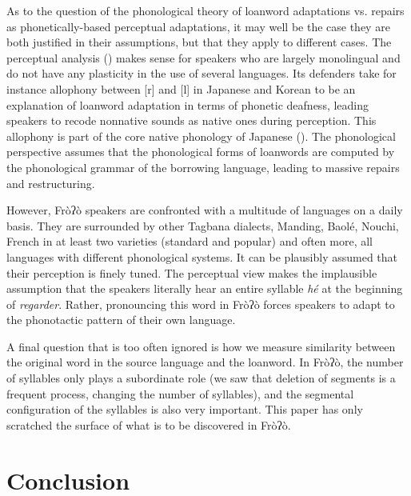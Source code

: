 \documentclass[output=paper]{langscibook}
\begin{document}
As to the question of the phonological theory of loanword adaptations vs. repairs as phonetically{}-based perceptual adaptations, it may well be the case they are both justified in their assumptions, but that they apply to different cases. The perceptual analysis (\citealt{Peperkamp2003}) makes sense for speakers who are largely monolingual and do not have any plasticity in the use of several languages. Its defenders take for instance allophony between [r] and [l] in Japanese and Korean to be an explanation of loanword adaptation in terms of phonetic deafness, leading speakers to recode nonnative sounds as native ones during perception. This allophony is part of the core native phonology of Japanese (\citealt{Ito1995}). The phonological perspective assumes that the phonological forms of loanwords are computed by the phonological grammar of the borrowing language, leading to massive repairs and restructuring. 

However, Fròʔò speakers are confronted with a multitude of languages on a daily basis. They are surrounded by other Tagbana dialects, Manding, Baolé, Nouchi, French in at least two varieties (standard and popular) and often more, all languages with different phonological systems. It can be plausibly assumed that their perception is finely tuned. The perceptual view makes the implausible assumption that the speakers literally hear an entire syllable \textit{hé} at the beginning of \textit{regarder}. Rather, pronouncing this word in Fròʔò forces speakers to adapt to the phonotactic pattern of their own language.

A final question that is too often ignored is how we measure similarity between the original word in the source language and the loanword. In Fròʔò, the number of syllables only plays a subordinate role (we saw that deletion of segments is a frequent process, changing the number of syllables), and the segmental configuration of the syllables is also very important. This paper has only scratched the surface of what is to be discovered in Fròʔò.

\section{Conclusion}
\label{sec:traore:conclusion:6}
\end{document}
